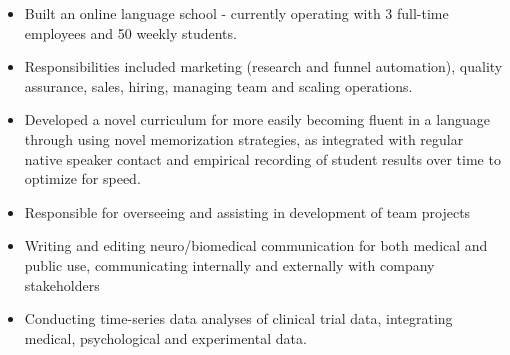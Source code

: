 \documentclass[10pt,a4paper,ragged2e]{altacv}
\begin{document}

\begin{fullwidth}
\makecvheader
\end{fullwidth}




\begin{itemize}
\item Built an online language school - currently operating with 3 full-time employees and 50 weekly students. 
\item Responsibilities included marketing (research and funnel automation), quality assurance, sales, hiring, managing team and scaling operations.
\item  Developed a novel curriculum for more easily becoming fluent in a language through using novel memorization strategies, as integrated with regular native speaker contact and empirical recording of student results over time to optimize for speed.
\end{itemize}
\divider\small

\begin{itemize}
\item Responsible for overseeing and assisting in development of team projects
\item Writing and editing neuro/biomedical communication for both medical and public use, communicating internally and externally with company stakeholders
\item Conducting time-series data analyses of clinical trial data, integrating medical, psychological and experimental data.
\end{itemize}
\divider\small
\end{document}
